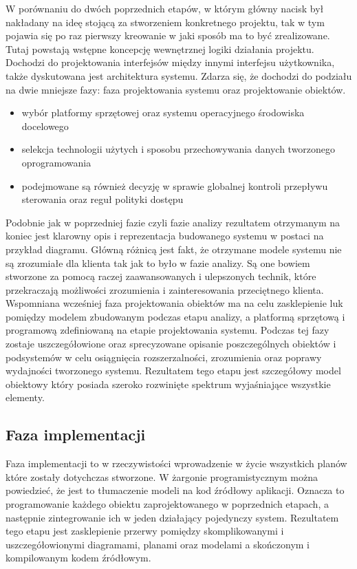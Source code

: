 \documentclass[oneside,polski,logo]{amuthesis}
\begin{document}
W porównaniu do dwóch poprzednich etapów, w którym główny nacisk był nakładany na ideę stojącą za stworzeniem konkretnego projektu, tak w tym pojawia się po raz pierwszy kreowanie w jaki sposób ma to być zrealizowane. Tutaj powstają wstępne koncepcję wewnętrznej logiki działania projektu. Dochodzi do projektowania interfejsów między innymi interfejsu użytkownika, także dyskutowana jest architektura systemu. Zdarza się, że dochodzi do podziału na dwie mniejsze fazy: faza projektowania systemu oraz projektowanie obiektów.\\
\begin{itemize}
	\item  wybór platformy sprzętowej oraz systemu operacyjnego środowiska docelowego 
	\item selekcja technologii użytych i sposobu przechowywania danych tworzonego oprogramowania 
	\item podejmowane są również decyzję w sprawie globalnej kontroli przepływu sterowania oraz reguł polityki dostępu \\
\end{itemize}
Podobnie jak w poprzedniej fazie czyli fazie analizy rezultatem otrzymanym na koniec jest klarowny opis i reprezentacja budowanego systemu w postaci na przykład diagramu. Główną różnicą jest fakt, że otrzymane modele systemu nie są zrozumiałe dla klienta tak jak to było w fazie analizy. Są one bowiem stworzone za pomocą raczej zaawansowanych i ulepszonych technik, które przekraczają możliwości zrozumienia i zainteresowania przeciętnego klienta.\\
Wspomniana wcześniej faza projektowania obiektów ma na celu zasklepienie luk pomiędzy modelem zbudowanym podczas etapu analizy, a platformą sprzętową i programową zdefiniowaną na etapie projektowania systemu. Podczas tej fazy zostaje uszczegółowione oraz sprecyzowane opisanie poszczególnych obiektów i podsystemów w celu osiągnięcia rozszerzalności, zrozumienia oraz poprawy wydajności tworzonego systemu. Rezultatem tego etapu jest szczegółowy model obiektowy który posiada szeroko rozwinięte spektrum wyjaśniające wszystkie elementy.\\

\subsection {Faza implementacji}
Faza implementacji to w rzeczywistości wprowadzenie w życie wszystkich planów które zostały dotychczas stworzone. W żargonie programistycznym można powiedzieć, że jest to tłumaczenie modeli na kod źródłowy aplikacji. Oznacza to programowanie każdego obiektu zaprojektowanego w poprzednich etapach, a następnie zintegrowanie ich w jeden działający pojedynczy system. Rezultatem tego etapu jest zasklepienie przerwy pomiędzy skomplikowanymi i uszczegółowionymi diagramami, planami oraz modelami a skończonym i kompilowanym kodem źródłowym.\\
\end{document}
